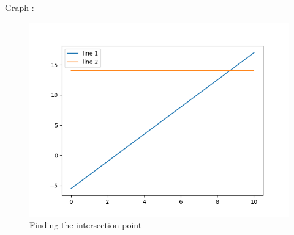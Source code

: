 \documentclass{beamer}
\begin{document}
\begin{frame}{Graph :}

\begin{figure}[h!]
\centering
\includegraphics[width= 8 cm]{fig1.png}
\caption{Finding the intersection point}
\label{Fig1}
\end{figure}

\end{frame}
\end{document}
